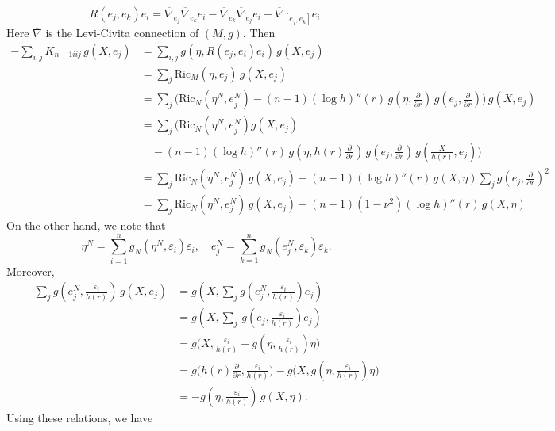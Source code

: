 \documentclass[amssymb,amstex,amsmath,11pt]{article}
\numberwithin{equation}{section}
\renewcommand{\epsilon}{\varepsilon}
\theoremstyle{plain}
\theoremstyle{definition}
\theoremstyle{remark}
\newcommand{\ddr}{\frac{\partial}{\partial r}}
\def\Ricm{\textrm{Ric}_M}
\def\Ricn{\textrm{Ric}_N}
\begin{document}
$$
R(e_j,e_k)e_i
=
\overline{\nabla}_{e_j}\overline{\nabla}_{e_k}e_i
-
\overline{\nabla}_{e_k}\overline{\nabla}_{e_j}e_i
-
\overline{\nabla}_{[e_j,e_k]}e_i.
$$
Here $\overline{\nabla}$ is the Levi-Civita connection of $(M,g)$. Then
\begin{align}
    -\sum_{i,j}K_{n+1iij}\,g(X,e_j)
    & = \sum_{i,j} g\left(\eta,R(e_j,e_i)e_i\right) \,g(X,e_j) \nonumber \\
    & = \sum_j \Ricm(\eta,e_j) \, g(X,e_j) \nonumber\\
    & = \sum_j \bigg(\Ricn \left(\eta^N,e_j^N\right)  - (n-1)(\log h)''(r) \, g\left(\eta,\ddr\right) \, g\left(e_j,\ddr\right)\bigg) \, g(X,e_j) \nonumber\\
    & = \sum_j \bigg(\Ricn\left(\eta^N,e_j^N\right)g(X,e_j) \nonumber\\
    &  \quad - (n-1)(\log h)''(r) \, g\left(\eta,h(r)\ddr\right) \, g\left(e_j,\ddr\right) \, g\left(\frac{X}{h(r)},e_j\right) \nonumber\bigg)\\
    & = \sum_j \Ricn\left(\eta^N,e_j^N\right) \, g(X,e_j) - (n-1)(\log h)''(r) \, g(X,\eta) \sum_j g\left(e_j,\ddr\right)^2 \nonumber \\
    & = \sum_j \Ricn\left(\eta^N,e_j^N\right) \, g(X,e_j) - (n-1)(1-\nu^2)(\log h)''(r) \, g(X,\eta) \nonumber
\end{align}
On the other hand, we note that
$$\eta^N = \sum_{i=1}^{n} g_N\left(\eta^N,\epsilon_i\right)\epsilon_i, \quad e_j^N = \sum_{k=1}^{n} g_N\left(e_j^N,\epsilon_k\right)\epsilon_k.$$
Moreover,
\begin{align*}
    \sum_j g\left(e_j^N,\frac{\epsilon_i}{h(r)}\right) \, g(X,e_j) & = g\left(X,\sum_jg\left(e_j^N,\frac{\epsilon_i}{h(r)}\right)e_j\right) \nonumber \\
    & = g\left(X,\sum_j \, g\left(e_j,\frac{\epsilon_i}{h(r)}\right)e_j\right) \nonumber \\
    & = g\bigg(X,\frac{\epsilon_i}{h(r)}-g\left(\eta,\frac{\epsilon_i}{h(r)}\right)\eta\bigg) \nonumber \\
    & = g\bigg(h(r)\ddr,\frac{\epsilon_i}{h(r)}\bigg) - g\bigg(X, g\left(\eta,\frac{\epsilon_i}{h(r)}\right)\eta\bigg) \nonumber \\
    & = -g\left(\eta,\frac{\epsilon_i}{h(r)}\right)\,g(X,\eta).
\end{align*}
Using these relations, we have
\end{document}

